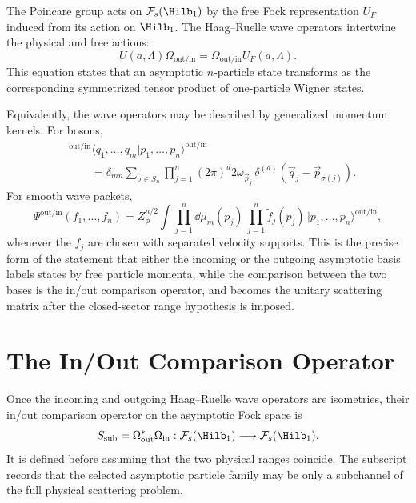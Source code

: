 The Poincare group acts on \(\mathcal F_s(\Hilb_1)\) by the free Fock
representation \(U_F\) induced from its action on \(\Hilb_1\). The
Haag--Ruelle wave operators intertwine the physical and free actions:
\[
  U(a,\Lambda)\Omega_{\mathrm{out/in}}
  =
  \Omega_{\mathrm{out/in}}U_F(a,\Lambda).
\]
This equation states that an asymptotic \(n\)-particle state transforms as
the corresponding symmetrized tensor product of one-particle Wigner states.

Equivalently, the wave operators may be described by generalized momentum
kernels.
For bosons,
\[
\begin{aligned}
&{}^{\mathrm{out/in}}\langle
q_1,\ldots,q_m|p_1,\ldots,p_n\rangle^{\mathrm{out/in}}
\\
&\qquad =
\delta_{mn}\sum_{\sigma\in S_n}
\prod_{j=1}^n
(2\pi)^d2\omega_{\vec p_j}\,
\delta^{(d)}(\vec q_j-\vec p_{\sigma(j)}).
\end{aligned}
\]
For smooth wave packets,
\[
  \Psi^{\mathrm{out/in}}(f_1,\ldots,f_n)
  =
  Z_\phi^{n/2}
  \int\prod_{j=1}^n\dd\mu_m(p_j)\,
  \prod_{j=1}^n\tilde f_j(p_j)\,
  |p_1,\ldots,p_n\rangle^{\mathrm{out/in}},
\]
whenever the \(f_j\) are chosen with separated velocity supports.  This is the
precise form of the statement that either the incoming or the outgoing
asymptotic basis labels states by free particle momenta, while the comparison
between the two bases is the in/out comparison operator, and becomes the
unitary scattering matrix after the closed-sector range hypothesis is imposed.

\begin{center}
\end{center}

\section{The In/Out Comparison Operator}

\begin{definition}
\label{def:hr-scattering-operator-massive-sector}
Once the incoming and outgoing Haag--Ruelle wave operators are isometries,
their in/out comparison operator on the asymptotic Fock space is
\[
  S_{\mathrm{sub}}
  =
  \Omega_{\mathrm{out}}^*\Omega_{\mathrm{in}}
  :
  \mathcal F_s(\Hilb_1)\longrightarrow \mathcal F_s(\Hilb_1).
\]
It is defined before assuming that the two physical ranges coincide.  The
subscript records that the selected asymptotic particle family may be only a
subchannel of the full physical scattering problem.
\end{definition}

